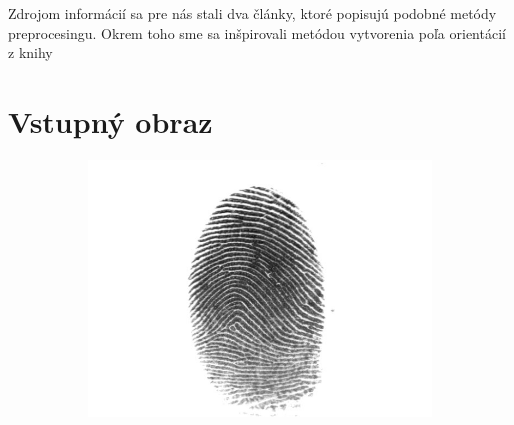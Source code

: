 \documentclass[11pt,a4paper]{article}
\begin{document}
Zdrojom informácií sa pre nás stali dva články, ktoré popisujú podobné metódy preprocesingu\cite{hong, thai}. Okrem toho sme sa inšpirovali metódou vytvorenia poľa orientácií z knihy \cite{kniha}

\section*{Vstupný obraz}
\begin{figure}[h]
	\centering
	\begin{subfigure}{0.25\textwidth}
		\centering
		\includegraphics[width=.95\linewidth]{images/Screenshot_1}
	\end{subfigure}%
	\begin{subfigure}{0.25\textwidth}
		\centering

\end{subfigure}
\end{figure}
\end{document}
